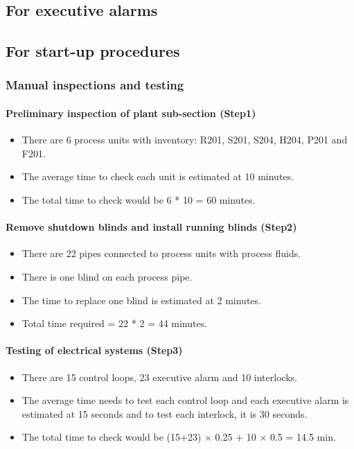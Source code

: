 \subsection{For executive alarms}

\subsection{For start-up procedures}

\subsubsection{Manual inspections and testing}
\paragraph{Preliminary inspection of plant sub-section (Step1)}
    \begin{itemize}
        \item There are 6 process units with inventory: R201, S201, S204, H204, P201 and F201.
        \item The average time to check each unit is estimated at 10 minutes.
        \item The total time to check would be 6 * 10 = 60 minutes.
    \end{itemize}

\paragraph{Remove shutdown blinds and install running blinds (Step2)}
    \begin{itemize}
        \item There are 22 pipes connected to process units with process fluids.
        \item There is one blind on each process pipe.
        \item The time to replace one blind is estimated at 2 minutes.
        \item Total time required = 22 * 2 = 44 minutes.
    \end{itemize}
    
\paragraph{Testing of electrical systems (Step3)}
 \begin{itemize}
        \item There are 15 control loops, 23 executive alarm and 10 interlocks.
        \item The average time needs to test each control loop and each executive alarm is estimated at 15 seconds and to test each interlock, it is 30 seconds.
        \item The total time to check would be (15+23) $\times$ 0.25 + 10 $\times$ 0.5 = 14.5 min.
    \end{itemize}
    
